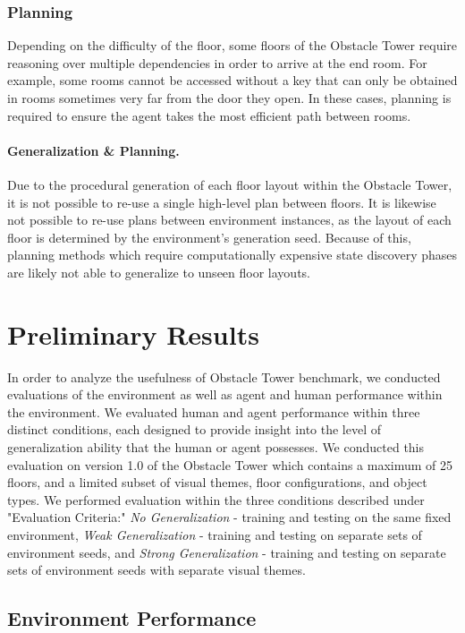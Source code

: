 \documentclass{article}
\begin{document}
\subsubsection{Planning}
Depending on the difficulty of the floor, some floors of the Obstacle Tower require reasoning over multiple dependencies in order to arrive at the end room. For example, some rooms cannot be accessed without a key that can only be obtained in rooms sometimes very far from the door they open. In these cases, planning is required to ensure the agent takes the most efficient path between rooms.

\paragraph{Generalization \& Planning.} Due to the procedural generation of each floor layout within the Obstacle Tower, it is not possible to re-use a single high-level plan between floors. It is likewise not possible to re-use plans between environment instances, as the layout of each floor is determined by the environment's generation seed. Because of this, planning methods which require computationally expensive state discovery phases are likely not able to generalize to unseen floor layouts. 

\section{Preliminary Results}


In order to analyze the usefulness of Obstacle Tower benchmark, we conducted evaluations of the environment as well as agent and human performance within the environment. We evaluated human and agent performance within three distinct conditions, each designed to provide insight into the level of generalization ability that the human or agent possesses. We conducted this evaluation on version 1.0 of the Obstacle Tower which contains a maximum of 25 floors, and a limited subset of visual themes, floor configurations, and object types. We performed evaluation within the three conditions described under "Evaluation Criteria:" \emph{No Generalization} - training and testing on the same fixed environment, \emph{Weak Generalization} - training and testing on separate sets of environment seeds, and \emph{Strong Generalization} - training and testing on separate sets of environment seeds with separate visual themes.

\subsection{Environment Performance}
\end{document}
